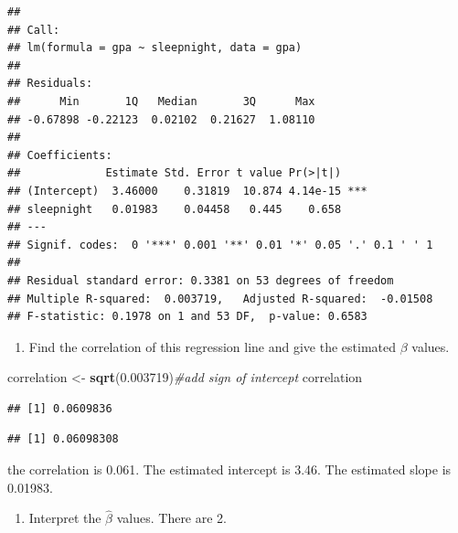 \documentclass[]{article}
\newenvironment{Shaded}{\begin{snugshade}}{\end{snugshade}}
\newcommand{\CommentTok}[1]{\textcolor[rgb]{0.56,0.35,0.01}{\textit{#1}}}
\newcommand{\FloatTok}[1]{\textcolor[rgb]{0.00,0.00,0.81}{#1}}
\newcommand{\KeywordTok}[1]{\textcolor[rgb]{0.13,0.29,0.53}{\textbf{#1}}}
\newcommand{\NormalTok}[1]{#1}
\newcommand{\OperatorTok}[1]{\textcolor[rgb]{0.81,0.36,0.00}{\textbf{#1}}}
\newcommand{\StringTok}[1]{\textcolor[rgb]{0.31,0.60,0.02}{#1}}
\providecommand{\tightlist}{%
  \setlength{\itemsep}{0pt}\setlength{\parskip}{0pt}}
\begin{document}
\begin{verbatim}
## 
## Call:
## lm(formula = gpa ~ sleepnight, data = gpa)
## 
## Residuals:
##      Min       1Q   Median       3Q      Max 
## -0.67898 -0.22123  0.02102  0.21627  1.08110 
## 
## Coefficients:
##             Estimate Std. Error t value Pr(>|t|)    
## (Intercept)  3.46000    0.31819  10.874 4.14e-15 ***
## sleepnight   0.01983    0.04458   0.445    0.658    
## ---
## Signif. codes:  0 '***' 0.001 '**' 0.01 '*' 0.05 '.' 0.1 ' ' 1
## 
## Residual standard error: 0.3381 on 53 degrees of freedom
## Multiple R-squared:  0.003719,   Adjusted R-squared:  -0.01508 
## F-statistic: 0.1978 on 1 and 53 DF,  p-value: 0.6583
\end{verbatim}

\newpage

\begin{enumerate}
\def\labelenumi{\arabic{enumi}.}
\setcounter{enumi}{3}
\tightlist
\item
  Find the correlation of this regression line and give the estimated
  \(\beta\) values.
\end{enumerate}

\begin{Shaded}
\begin{Highlighting}[]
\NormalTok{correlation <-}\StringTok{ }\KeywordTok{sqrt}\NormalTok{(}\FloatTok{0.003719}\NormalTok{)}\CommentTok{#add sign of intercept}
\NormalTok{correlation}
\end{Highlighting}
\end{Shaded}

\begin{verbatim}
## [1] 0.0609836
\end{verbatim}

\begin{Shaded}
\end{Shaded}

\begin{verbatim}
## [1] 0.06098308
\end{verbatim}

the correlation is 0.061. The estimated intercept is 3.46. The estimated
slope is 0.01983.

\begin{enumerate}
\def\labelenumi{\arabic{enumi}.}
\setcounter{enumi}{4}
\tightlist
\item
  Interpret the \(\hat{\beta}\) values. There are 2.
\end{enumerate}
\end{document}
